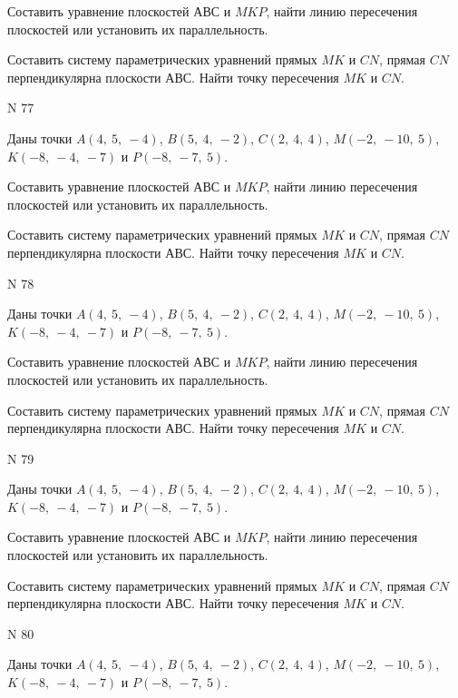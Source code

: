 \documentclass[11pt]{report}
\begin{document}
Составить уравнение плоскостей $АВС$ и $MKP$,
найти линию пересечения плоскостей или установить их параллельность.

Составить систему параметрических уравнений прямых $MK$ и $CN$,
прямая $CN$ перпендикулярна плоскости $АВС$. 
Найти точку пересечения $MK$ и $CN$.



 N 77

Даны точки $A\left( 4, \  5, \  -4\right)$, $B\left( 5, \  4, \  -2\right)$, $C\left( 2, \  4, \  4\right)$, $M\left( -2, \  -10, \  5\right)$, $K\left( -8, \  -4, \  -7\right)$ и $P\left( -8, \  -7, \  5\right)$.


Составить уравнение плоскостей $АВС$ и $MKP$,
найти линию пересечения плоскостей или установить их параллельность.

Составить систему параметрических уравнений прямых $MK$ и $CN$,
прямая $CN$ перпендикулярна плоскости $АВС$. 
Найти точку пересечения $MK$ и $CN$.



 N 78

Даны точки $A\left( 4, \  5, \  -4\right)$, $B\left( 5, \  4, \  -2\right)$, $C\left( 2, \  4, \  4\right)$, $M\left( -2, \  -10, \  5\right)$, $K\left( -8, \  -4, \  -7\right)$ и $P\left( -8, \  -7, \  5\right)$.


Составить уравнение плоскостей $АВС$ и $MKP$,
найти линию пересечения плоскостей или установить их параллельность.

Составить систему параметрических уравнений прямых $MK$ и $CN$,
прямая $CN$ перпендикулярна плоскости $АВС$. 
Найти точку пересечения $MK$ и $CN$.



 N 79

Даны точки $A\left( 4, \  5, \  -4\right)$, $B\left( 5, \  4, \  -2\right)$, $C\left( 2, \  4, \  4\right)$, $M\left( -2, \  -10, \  5\right)$, $K\left( -8, \  -4, \  -7\right)$ и $P\left( -8, \  -7, \  5\right)$.


Составить уравнение плоскостей $АВС$ и $MKP$,
найти линию пересечения плоскостей или установить их параллельность.

Составить систему параметрических уравнений прямых $MK$ и $CN$,
прямая $CN$ перпендикулярна плоскости $АВС$. 
Найти точку пересечения $MK$ и $CN$.



 N 80

Даны точки $A\left( 4, \  5, \  -4\right)$, $B\left( 5, \  4, \  -2\right)$, $C\left( 2, \  4, \  4\right)$, $M\left( -2, \  -10, \  5\right)$, $K\left( -8, \  -4, \  -7\right)$ и $P\left( -8, \  -7, \  5\right)$.
\end{document}
